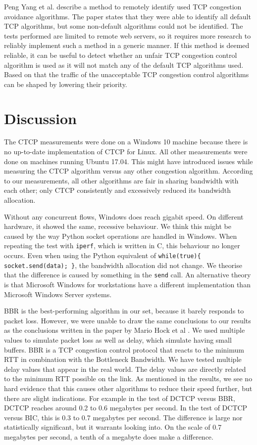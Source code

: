 \documentclass{article}
\begin{document}
Peng Yang et al. describe a method to remotely identify used TCP congestion
avoidance algorithms\cite{tcp-congestion-identification}. The paper states that
they were able to identify all default TCP algorithms, but some non-default
algorithms could not be identified. The tests performed are limited to remote
web servers, so it requires more research to reliably implement such a method
in a generic manner. If this method is deemed reliable, it can be useful to
detect whether an unfair TCP congestion control algorithm is used as it will
not match any of the default TCP algorithms used. Based on that the traffic of
the unacceptable TCP congestion control algorithms can be shaped by lowering
their priority.


\section{Discussion}\label{sec:discussion}

The CTCP measurements were done on a Windows 10 machine because there is no
up-to-date implementation of CTCP for Linux. All other measurements were done
on machines running Ubuntu 17.04. This might have introduced issues while
measuring the CTCP algorithm versus any other congestion algorithm. According
to our measurements, all other algorithms are fair in sharing bandwidth with
each other; only CTCP consistently and excessively reduced its bandwidth
allocation.

Without any concurrent flows, Windows does reach gigabit speed. On different
hardware, it showed the same, recessive behaviour. We think this might be
caused by the way Python socket operations are handled in Windows. When
repeating the test with \texttt{iperf}, which is written in C, this behaviour
no longer occurs. Even when using the Python equivalent of
\texttt{while(true)\{ socket.send(data); \}}, the bandwidth allocation did not
change. We theorise that the difference is caused by something in the
\texttt{send} call. An alternative theory is that Microsoft Windows for
workstations have a different implementation than Microsoft Windows Server
systems.

BBR is the best-performing algorithm in our set, because it barely responds to
packet loss. However, we were unable to draw the same conclusions to our results as the conclusions written in the paper by Mario Hock et al \cite{bbr-congestion-comparison}. We used multiple values to simulate packet loss as well as delay, which simulate having small buffers. BBR is a TCP congestion control protocol that reacts to the minimum RTT in combination with the Bottleneck Bandwidth. We have tested multiple delay values that appear in the real world. The delay values are directly related to the minimum RTT possible on the link. As mentioned in the results, we see no hard evidence that this
causes other algorithms to reduce their speed further, but there are slight
indications. For example in the test of DCTCP versus BBR, DCTCP reaches around
0.2 to 0.6 megabytes per second. In the test of DCTCP versus BIC, this is 0.3
to 0.7 megabytes per second. The difference is large nor statistically
significant, but it warrants looking into. On the scale of 0.7 megabytes per
second, a tenth of a megabyte does make a difference.
\end{document}
